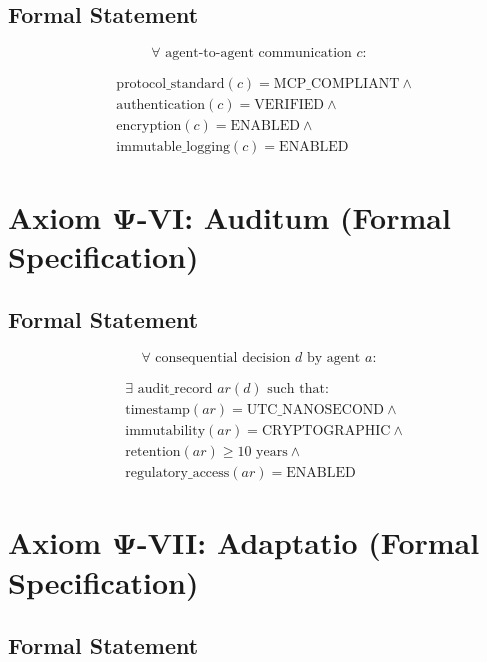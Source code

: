 \documentclass[12pt,a4paper,twoside,openright]{book}
\begin{document}
\subsection{Formal Statement}

\begin{equation}
\forall \text{ agent-to-agent communication } c:
\end{equation}

\begin{align}
&\text{protocol\_standard}(c) = \text{MCP\_COMPLIANT} \land \\
&\text{authentication}(c) = \text{VERIFIED} \land \\
&\text{encryption}(c) = \text{ENABLED} \land \\
&\text{immutable\_logging}(c) = \text{ENABLED}
\end{align}

\section{Axiom Ψ-VI: Auditum (Formal Specification)}

\subsection{Formal Statement}

\begin{equation}
\forall \text{ consequential decision } d \text{ by agent } a:
\end{equation}

\begin{align}
&\exists \text{ audit\_record } ar(d) \text{ such that:} \\
&\text{timestamp}(ar) = \text{UTC\_NANOSECOND} \land \\
&\text{immutability}(ar) = \text{CRYPTOGRAPHIC} \land \\
&\text{retention}(ar) \geq 10\text{ years} \land \\
&\text{regulatory\_access}(ar) = \text{ENABLED}
\end{align}

\section{Axiom Ψ-VII: Adaptatio (Formal Specification)}

\subsection{Formal Statement}
\end{document}
